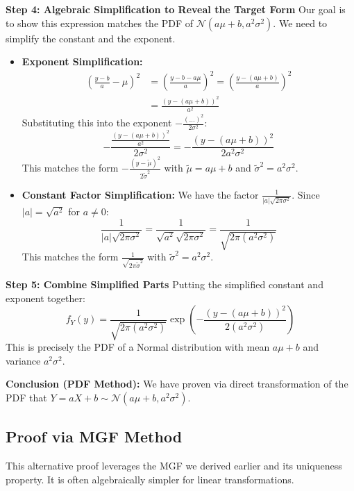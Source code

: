 \documentclass[11pt, letterpaper]{article}
\theoremstyle{definition}
\theoremstyle{remark}
\begin{document}
\textbf{Step 4: Algebraic Simplification to Reveal the Target Form}
Our goal is to show this expression matches the PDF of $\mathcal{N}(a\mu+b, a^2\sigma^2)$. We need to simplify the constant and the exponent.
\begin{itemize}
    \item \textbf{Exponent Simplification:}
    \begin{align*}
        \left(\frac{y-b}{a} - \mu\right)^2 &= \left(\frac{y-b-a\mu}{a}\right)^2 = \left(\frac{y-(a\mu+b)}{a}\right)^2 \\
        &= \frac{(y-(a\mu+b))^2}{a^2}
    \end{align*}
    Substituting this into the exponent $-\frac{(\dots)^2}{2\sigma^2}$:
    $$ -\frac{\frac{(y-(a\mu+b))^2}{a^2}}{2\sigma^2} = -\frac{(y-(a\mu+b))^2}{2 a^2 \sigma^2} $$
    This matches the form $-\frac{(y-\tilde{\mu})^2}{2\tilde{\sigma}^2}$ with $\tilde{\mu}=a\mu+b$ and $\tilde{\sigma}^2 = a^2\sigma^2$.

    \item \textbf{Constant Factor Simplification:}
    We have the factor $\frac{1}{|a|\sqrt{2\pi\sigma^2}}$. Since $|a| = \sqrt{a^2}$ for $a \neq 0$:
    $$ \frac{1}{|a|\sqrt{2\pi\sigma^2}} = \frac{1}{\sqrt{a^2}\sqrt{2\pi\sigma^2}} = \frac{1}{\sqrt{2\pi (a^2\sigma^2)}} $$
    This matches the form $\frac{1}{\sqrt{2\pi\tilde{\sigma}^2}}$ with $\tilde{\sigma}^2=a^2\sigma^2$.
\end{itemize}

\textbf{Step 5: Combine Simplified Parts}
Putting the simplified constant and exponent together:
$$ f_Y(y) = \frac{1}{\sqrt{2 \pi (a^2 \sigma^2)}} \exp\left( -\frac{(y - (a\mu+b))^2}{2 (a^2 \sigma^2)} \right) $$
This is precisely the PDF of a Normal distribution with mean $a\mu+b$ and variance $a^2\sigma^2$.

\textbf{Conclusion (PDF Method):} We have proven via direct transformation of the PDF that $Y=aX+b \sim \mathcal{N}(a\mu+b, a^2\sigma^2)$.

\subsection{Proof via MGF Method}

This alternative proof leverages the MGF we derived earlier and its uniqueness property. It is often algebraically simpler for linear transformations.
\end{document}

